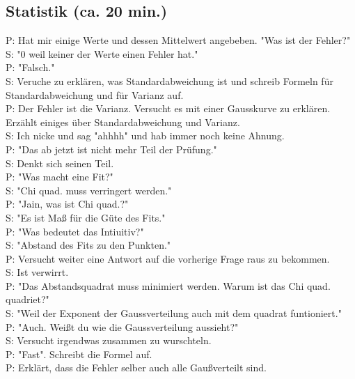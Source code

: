 \documentclass[10pt]{article}
\begin{document}
\begin{multicols}{2}
\section{Statistik (ca. 20 min.)}
P: Hat mir einige Werte und dessen Mittelwert angebeben. "Was ist der Fehler?" \\
S: "0 weil keiner der Werte einen Fehler hat." \\
P: "Falsch."\\
S: Veruche zu erklären, was Standardabweichung ist und schreib Formeln für Standardabweichung und für Varianz auf. \\
P: Der Fehler ist die Varianz. Versucht es mit einer Gausskurve zu erklären. Erzählt einiges über Standardabweichung und Varianz.\\
S: Ich nicke und sag "ahhhh" und hab immer noch keine Ahnung.\\
P: "Das ab jetzt ist nicht mehr Teil der Prüfung."\\
S: Denkt sich seinen Teil.\\
P: "Was macht eine Fit?"\\
S: "Chi quad. muss verringert werden."\\
P: "Jain, was ist Chi quad.?" \\
S: "Es ist Maß für die Güte des Fits."\\
P: "Was bedeutet das Intiuitiv?"\\
S: "Abstand des Fits zu den Punkten."\\
P: Versucht weiter eine Antwort auf die vorherige Frage raus zu bekommen. \\
S: Ist verwirrt.\\
P: "Das Abstandsquadrat muss minimiert werden. Warum ist das Chi quad. quadriet?"\\
S: "Weil der Exponent der Gaussverteilung auch mit dem quadrat funtioniert."\\
P: "Auch. Weißt du wie die Gaussverteilung aussieht?"\\
S: Versucht irgendwas zusammen zu wurschteln.\\
P: "Fast". Schreibt die Formel auf.\\
P: Erklärt, dass die Fehler selber auch alle Gaußverteilt sind.\\

\end{multicols}
\end{document}
